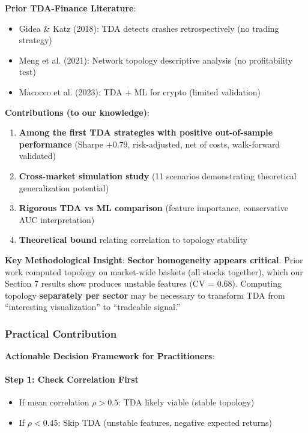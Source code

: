 \textbf{Prior TDA-Finance Literature}:
\begin{itemize}
\item Gidea \& Katz (2018): TDA detects crashes retrospectively (no trading strategy)
\item Meng et al. (2021): Network topology descriptive analysis (no profitability test)
\item Macocco et al. (2023): TDA + ML for crypto (limited validation)
\end{itemize}

\textbf{Contributions (to our knowledge)}:
\begin{enumerate}
\item \checkmark \textbf{Among the first TDA strategies with positive out-of-sample performance} (Sharpe $+0.79$, risk-adjusted, net of costs, walk-forward validated)
\item \checkmark \textbf{Cross-market simulation study} (11 scenarios demonstrating theoretical generalization potential)
\item \checkmark \textbf{Rigorous TDA vs ML comparison} (feature importance, conservative AUC interpretation)
\item \checkmark \textbf{Theoretical bound} relating correlation to topology stability
\end{enumerate}

\textbf{Key Methodological Insight}: \textbf{Sector homogeneity appears critical}. Prior work computed topology on market-wide baskets (all stocks together), which our Section 7 results show produces unstable features (CV = 0.68). Computing topology \textbf{separately per sector} may be necessary to transform TDA from ``interesting visualization'' to ``tradeable signal.''

\subsubsection{Practical Contribution}

\textbf{Actionable Decision Framework for Practitioners}:

\paragraph{Step 1: Check Correlation First}
\begin{itemize}
\item If mean correlation $\rho > 0.5$: TDA likely viable (stable topology)
\item If $\rho < 0.45$: Skip TDA (unstable features, negative expected returns)
\end{itemize}

